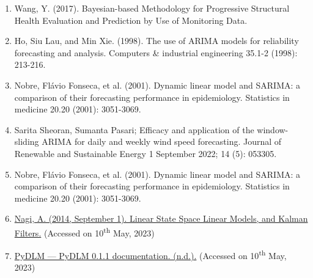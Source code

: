 \documentclass[a4paper,12pt]{article}
\begin{document}
\begin{enumerate}
\item Wang, Y. (2017). Bayesian-based Methodology for Progressive Structural Health Evaluation and Prediction by Use of Monitoring Data.
\item Ho, Siu Lau, and Min Xie. (1998). The use of ARIMA models for reliability forecasting and analysis. Computers \& industrial engineering 35.1-2 (1998): 213-216.
\item Nobre, Flávio Fonseca, et al. (2001). Dynamic linear model and SARIMA: a comparison of their forecasting performance in epidemiology. Statistics in medicine 20.20 (2001): 3051-3069.
\item Sarita Sheoran, Sumanta Pasari; Efficacy and application of the window-sliding ARIMA for daily and weekly wind speed forecasting. Journal of Renewable and Sustainable Energy 1 September 2022; 14 (5): 053305.
\item Nobre, Flávio Fonseca, et al. (2001). Dynamic linear model and SARIMA: a comparison of their forecasting performance in epidemiology. Statistics in medicine 20.20 (2001): 3051-3069.
\item \href{http://lalas.github.io/quantitativeThoughts/r/2014/09/01/dlmTutorial.html}{Nagi, A. (2014, September 1). Linear State Space Linear Models, and Kalman Filters.} (Accessed on 10\textsuperscript{th} May, 2023)
\item \href{https://pydlm.github.io/index.html}{PyDLM — PyDLM 0.1.1 documentation. (n.d.).} (Accessed on 10\textsuperscript{th} May, 2023)
\end{enumerate}
\pagebreak
\end{document}
